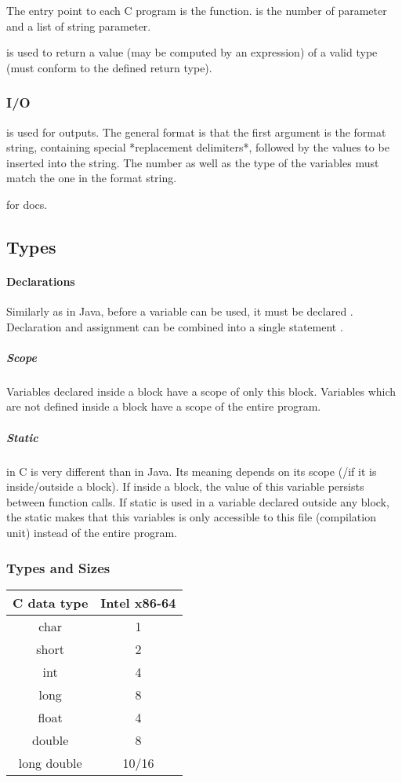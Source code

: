 
The entry point to each C program is the  function.  is the number of parameter and  a list of string parameter.

 is used to return a value (may be computed by an expression) of a valid type (must conform to the defined return type).

\subsubsection{I/O}
 is used for outputs. The general format is that the first argument is the format string, containing special *replacement delimiters*, followed by the values to be inserted into the string. The number as well as the type of the variables must match the one in the format string.

 for docs. 

\subsection*{Types}

\paragraph{Declarations}
Similarly as in Java, before a variable can be used, it must be declared . Declaration and assignment can be combined into a single statement .

\subparagraph{Scope}
Variables declared inside a block have a scope of only this block. Variables which are not defined inside a block have a scope of the entire program. 

\subparagraph{Static}
 in C is very different than in Java. Its meaning depends on its scope (/if it is inside/outside a block). If inside a block, the value of this variable persists between function calls. If static is used in a variable declared outside any block, the static makes that this variables is only accessible to this file (compilation unit) instead of the entire program.

\subsubsection{Types and Sizes}
\begin{table}[H]
    \centering
    \begin{tabular}{c c}
        C data type & Intel x86-64\\
        \hline
        char & 1\\
        short & 2\\
        int & 4\\
        long & 8\\
        float & 4\\
        double & 8\\
        long double & 10/16\\
    \end{tabular}
\end{table}

